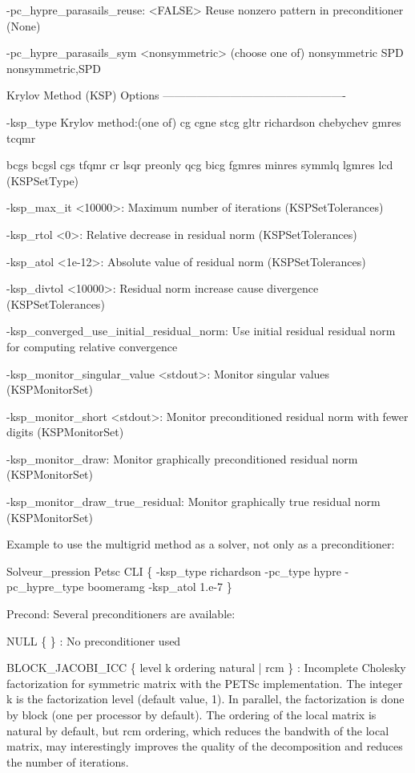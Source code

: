   -pc\_hypre\_parasails\_reuse: <FALSE> Reuse nonzero pattern in preconditioner (None)

  -pc\_hypre\_parasails\_sym <nonsymmetric> (choose one of) nonsymmetric SPD nonsymmetric,SPD

Krylov Method (KSP) Options -------------------------------------------------

  -ksp\_type Krylov method:(one of) cg cgne stcg gltr richardson chebychev gmres tcqmr

      bcgs bcgsl cgs tfqmr cr lsqr preonly qcg bicg fgmres minres symmlq lgmres lcd (KSPSetType)

  -ksp\_max\_it <10000>: Maximum number of iterations (KSPSetTolerances)

  -ksp\_rtol <0>: Relative decrease in residual norm (KSPSetTolerances)

  -ksp\_atol <1e-12>: Absolute value of residual norm (KSPSetTolerances)

  -ksp\_divtol <10000>: Residual norm increase cause divergence (KSPSetTolerances)

  -ksp\_converged\_use\_initial\_residual\_norm: Use initial residual residual norm for computing relative convergence

  -ksp\_monitor\_singular\_value <stdout>: Monitor singular values (KSPMonitorSet)

  -ksp\_monitor\_short <stdout>: Monitor preconditioned residual norm with fewer digits (KSPMonitorSet)

  -ksp\_monitor\_draw: Monitor graphically preconditioned residual norm (KSPMonitorSet)

  -ksp\_monitor\_draw\_true\_residual: Monitor graphically true residual norm (KSPMonitorSet)



Example to use the multigrid method as a solver, not only as a preconditioner:

Solveur\_pression Petsc CLI \{ -ksp\_type richardson -pc\_type hypre -pc\_hypre\_type boomeramg -ksp\_atol 1.e-7 \}





Precond: Several preconditioners are available:

	NULL \{ \} : No preconditioner used

	BLOCK\_JACOBI\_ICC \{ level k ordering natural | rcm \} : Incomplete Cholesky factorization for symmetric matrix with the PETSc implementation. The integer k is the factorization level (default value, 1). In parallel, the factorization is done by block (one per processor by default). The ordering of the local matrix is natural by default, but rcm ordering, which reduces the bandwith of the local matrix, may interestingly improves the quality of the decomposition and reduces the number of iterations.

